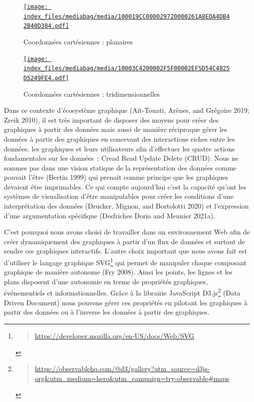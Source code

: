\documentclass[
  letterpaper,
  DIV=11,
  numbers=noendperiod]{scrreprt}
\begin{document}
\begin{figure}

{\centering 

\href{https://commons.wikimedia.org/wiki/File:Rovinna_kartezska_soustava_souradnic.svg}{\texttt{[image: index\_files/mediabag/media/100019CC000029720000261A8EDA4DB42B40D384.pdf]}}

}

\caption{\label{fig-coor2D}Coordonnées cartésiennes : planaires}

\end{figure}

\begin{figure}

{\centering 

\href{https://commons.wikimedia.org/wiki/File:Rectangular_coordinates.svg}{\texttt{[image: index\_files/mediabag/media/10003C4200002F5F00002EF5D54C4825D5249FE4.pdf]}}

}

\caption{\label{fig-coor3D}Coordonnées cartésiennes :
tridimensionnelles}

\end{figure}

Dans ce contexte d'écosystème graphique (Aït-Touati, Arènes, and
Grégoire 2019; Zreik 2010), il est très important de disposer des moyens
pour créer des graphiques à partir des données mais aussi de manière
réciproque gérer les données à partir des graphiques en concevant des
interactions riches entre les données, les graphiques et leurs
utilisateurs afin d'effectuer les quatre actions fondamentales sur les
données~: Cread Read Update Delete (CRUD). Nous ne sommes pas dans une
vision statique de la représentation des données comme pouvait l'être
(Bertin 1999) qui prenait comme principe que les graphiques devaient
être imprimables. Ce qui compte aujourd'hui c'est la capacité qu'ont les
systèmes de visualisation d'être manipulables pour créer les conditions
d'une interprétation des données (Drucker, Mignon, and Bortolotti 2020)
et l'expression d'une argumentation spécifique (Desfriches Doria and
Meunier 2021a).

C'est pourquoi nous avons choisi de travailler dans un environnement Web
afin de créer dynamiquement des graphiques à partir d'un flux de données
et surtout de rendre ces graphiques interactifs. L'autre choix important
que nous avons fait est d'utiliser le langage graphique SVG\footnote{\begin{quote}
  \url{https://developer.mozilla.org/en-US/docs/Web/SVG}
  \end{quote}} qui permet de manipuler chaque composant graphique de
manière autonome (Fry 2008). Ainsi les points, les lignes et les plans
disposent d'une autonomie en terme de propriétés graphiques,
événementiels et informationnelles. Grâce à la librairie JavaScript
D3.js\footnote{\begin{quote}
  \url{https://observablehq.com/@d3/gallery?utm_source=d3js-org\&utm_medium=hero\&utm_campaign=try-observable\#maps}
  \end{quote}} (Data Driven Document) nous pouvons gérer ces propriétés
en pilotant les graphiques à partir des données ou à l'inverse les
données à partir des graphiques.
\end{document}
